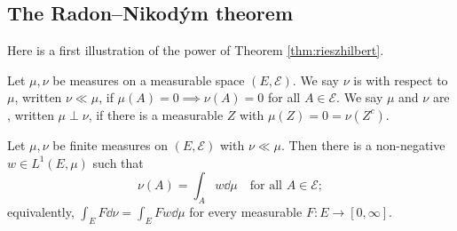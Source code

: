 \subsection{The Radon--Nikod\'ym theorem}

Here is a first illustration of the power of Theorem \ref{thm:rieszhilbert}.

\begin{definition}
	Let $\mu, \nu$ be measures on a measurable space $(E, \mathcal{E})$. We say $\nu$ is  with respect to $\mu$, written $\nu \ll \mu$, if $\mu(A) = 0 \implies \nu(A) = 0$ for all $A \in \mathcal{E}$. We say $\mu$ and $\nu$ are , written $\mu \perp \nu$, if there is a measurable $Z$ with $\mu(Z) = 0 = \nu(Z^c)$.
\end{definition}

\begin{theorem}\label{thm:radonnikodym}
	Let $\mu, \nu$ be finite measures on $(E,\mathcal{E})$ with $\nu \ll \mu$. Then there is a non-negative $w \in L^1(E,\mu)$ such that
	$$\nu(A) = \int_A w \dd \mu \quad \text{for all } A \in \mathcal{E};$$
	equivalently, $\int_E F \dd \nu = \int_E F w \dd\mu$ for every measurable $F : E \to [0,\infty]$.
\end{theorem}

